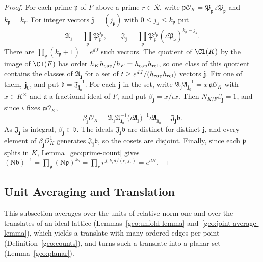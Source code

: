 \begin{proof}
For each prime $\mathfrak p$ of $F$ above a prime $r\in\mathcal R$, write
$\mathfrak p\mathcal O_K=\mathfrak P_{\mathfrak p}\,\iota\mathfrak
P_{\mathfrak p}$ and $k_{\mathfrak p}=k_r$. For integer vectors
$\boldsymbol j=(j_{\mathfrak p})$ with $0\le j_{\mathfrak p}\le
k_{\mathfrak p}$ put
\[
 \mathfrak A_{\boldsymbol j}=\prod_{\mathfrak p}
 \mathfrak P_{\mathfrak p}^{j_{\mathfrak p}},\qquad
 \mathfrak J_{\boldsymbol j}=\prod_{\mathfrak p}
 \mathfrak P_{\mathfrak p}^{j_{\mathfrak p}}
 (\iota\mathfrak P_{\mathfrak p})^{k_{\mathfrak p}-j_{\mathfrak p}}.
\]
There are $\prod_{\mathfrak p}(k_{\mathfrak p}+1)=e^{dJ}$ such vectors.
The quotient of $\Cl(K)$ by the image of $\Cl(F)$ has order
$h_Kh_{\rm cap}/h_F=h_{\rm cap}h_{\rm rel}$, so one class of this quotient
contains the classes of $\mathfrak A_{\boldsymbol j}$ for a set of
$t\ge e^{dJ}/(h_{\rm cap}h_{\rm rel})$ vectors $\boldsymbol j$. Fix one of
them, $\boldsymbol j_0$, and put $\mathfrak b=\mathfrak J_{\boldsymbol j_0}^{-1}$.
For each $\boldsymbol j$ in the set, write
$\mathfrak A_{\boldsymbol j}\mathfrak A_{\boldsymbol j_0}^{-1}
=x\,\mathfrak a\mathcal O_K$ with $x\in K^\times$ and $\mathfrak a$ a
fractional ideal of $F$, and put $\beta_{\boldsymbol j}=x/\iota x$.
Then $N_{K/F}\beta_{\boldsymbol j}=1$, and since $\iota$ fixes
$\mathfrak a\mathcal O_K$,
\[
 \beta_{\boldsymbol j}\mathcal O_K
 =\mathfrak A_{\boldsymbol j}\mathfrak A_{\boldsymbol j_0}^{-1}
 \bigl(\iota\mathfrak A_{\boldsymbol j}\bigr)^{-1}
 \iota\mathfrak A_{\boldsymbol j_0}
 =\mathfrak J_{\boldsymbol j}\mathfrak b.
\]
As $\mathfrak J_{\boldsymbol j}$ is integral,
$\beta_{\boldsymbol j}\in\mathfrak b$. The ideals $\mathfrak J_{\boldsymbol j}\mathfrak b$
are distinct for distinct $\boldsymbol j$, and every element of
$\beta_{\boldsymbol j}\mathcal O_K^1$ generates
$\mathfrak J_{\boldsymbol j}\mathfrak b$, so the cosets are disjoint. Finally,
since each $\mathfrak p$ splits in $K$, Lemma~\ref{geo:prime-count} gives
$(\mathrm N\mathfrak b)^{-1}=\prod_{\mathfrak p}(\mathrm N\mathfrak p)^{k_{\mathfrak p}}
=\prod_r r^{f_rk_rd/(e_rf_r)}=e^{dH}$.
\end{proof}

\subsection{Unit Averaging and Translation}
This subsection averages over the units of relative norm one and over the
translates of an ideal lattice (Lemmas~\ref{geo:unfold-lemma}
and~\ref{geo:joint-average-lemma}), which yields a translate with many
ordered edges per point (Definition~\ref{geo:counts}), and turns such a
translate into a planar set
(Lemma~\ref{geo:planar}).

